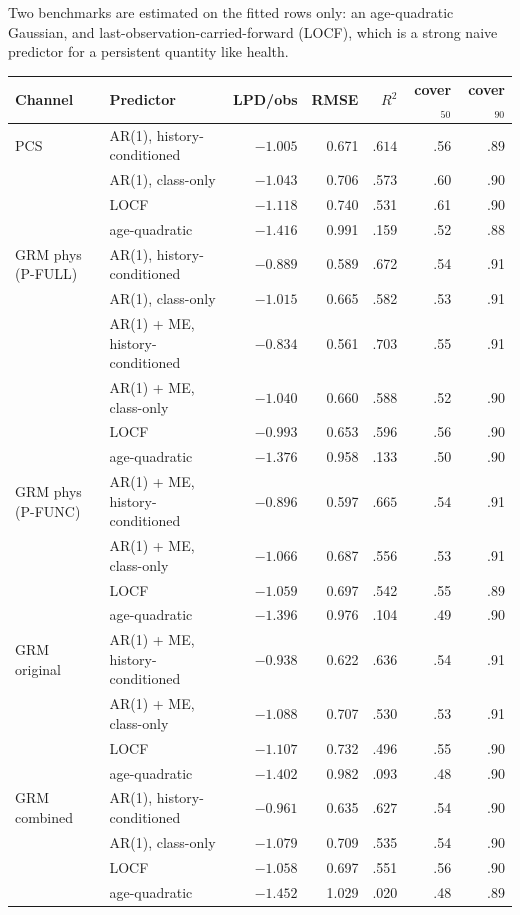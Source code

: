 \documentclass[11pt]{article}
\begin{document}
Two benchmarks are estimated on the fitted rows only: an age-quadratic
Gaussian, and last-observation-carried-forward (LOCF), which is a strong
naive predictor for a persistent quantity like health.

\begin{center}\small\setlength{\tabcolsep}{4pt}
\begin{tabular}{llrrrrr}
\toprule
Channel & Predictor & LPD/obs & RMSE & $R^2$ & cover$_{50}$ & cover$_{90}$ \\
\midrule
PCS & AR(1), history-conditioned & $\mathbf{-1.005}$ & 0.671 & $\mathbf{.614}$ & .56 & .89 \\
 & AR(1), class-only & $-1.043$ & 0.706 & .573 & .60 & .90 \\
 & LOCF & $-1.118$ & 0.740 & .531 & .61 & .90 \\
 & age-quadratic & $-1.416$ & 0.991 & .159 & .52 & .88 \\
\addlinespace
GRM phys (P-FULL) & AR(1), history-conditioned & $-0.889$ & 0.589 & .672 & .54 & .91 \\
 & AR(1), class-only & $-1.015$ & 0.665 & .582 & .53 & .91 \\
 & AR(1) + ME, history-conditioned & $\mathbf{-0.834}$ & 0.561 & $\mathbf{.703}$ & .55 & .91 \\
 & AR(1) + ME, class-only & $-1.040$ & 0.660 & .588 & .52 & .90 \\
 & LOCF & $-0.993$ & 0.653 & .596 & .56 & .90 \\
 & age-quadratic & $-1.376$ & 0.958 & .133 & .50 & .90 \\
\addlinespace
GRM phys (P-FUNC) & AR(1) + ME, history-conditioned & $\mathbf{-0.896}$ & 0.597 & $\mathbf{.665}$ & .54 & .91 \\
 & AR(1) + ME, class-only & $-1.066$ & 0.687 & .556 & .53 & .91 \\
 & LOCF & $-1.059$ & 0.697 & .542 & .55 & .89 \\
 & age-quadratic & $-1.396$ & 0.976 & .104 & .49 & .90 \\
\addlinespace
GRM original & AR(1) + ME, history-conditioned & $\mathbf{-0.938}$ & 0.622 & $\mathbf{.636}$ & .54 & .91 \\
 & AR(1) + ME, class-only & $-1.088$ & 0.707 & .530 & .53 & .91 \\
 & LOCF & $-1.107$ & 0.732 & .496 & .55 & .90 \\
 & age-quadratic & $-1.402$ & 0.982 & .093 & .48 & .90 \\
\addlinespace
GRM combined & AR(1), history-conditioned & $\mathbf{-0.961}$ & 0.635 & $\mathbf{.627}$ & .54 & .90 \\
 & AR(1), class-only & $-1.079$ & 0.709 & .535 & .54 & .90 \\
 & LOCF & $-1.058$ & 0.697 & .551 & .56 & .90 \\
 & age-quadratic & $-1.452$ & 1.029 & .020 & .48 & .89 \\
\bottomrule
\end{tabular}


\end{center}
\end{document}
